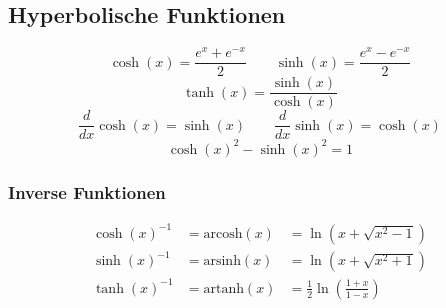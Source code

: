 \subsection{Hyperbolische Funktionen}
    $$ \cosh(x) = \frac{e^x + e^{-x}}{2} \qquad \sinh(x) = \frac{e^x - e^{-x}}{2}$$
    $$
        \tanh(x) = \frac{\sinh(x)}{\cosh(x)}
    $$
    $$
        \frac{d}{dx} \cosh(x) = \sinh(x) \qquad \frac{d}{dx} \sinh(x) = \cosh(x)
    $$
    $$
        \cosh(x)^2 - \sinh(x)^2 = 1
    $$

    \subsubsection{Inverse Funktionen}
        \begin{align*}
            \cosh(x)^{-1} &= \textrm{arcosh}(x) &= \ln(x + \sqrt{x^2 - 1})\\
            \sinh(x)^{-1} &= \textrm{arsinh}(x) &= \ln(x + \sqrt{x^2 + 1})\\
            \tanh(x)^{-1} &= \textrm{artanh}(x) &= \frac{1}{2} \ln(\frac{1+x}{1-x})
        \end{align*}
